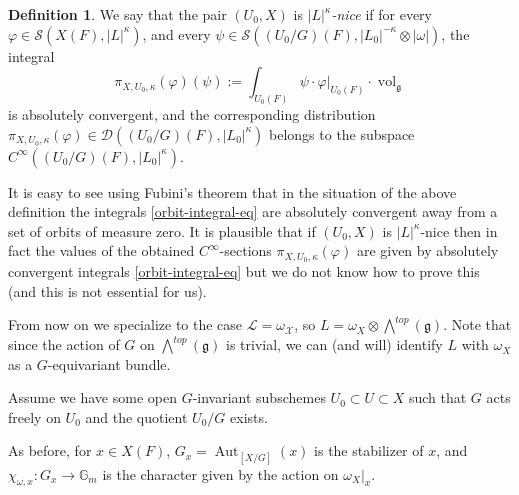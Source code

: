\documentclass[12pt,reqno]{amsart}
\DeclareMathOperator\C{\mathbb C}
\theoremstyle{definition}
\newtheorem{definition}[theorem]{Definition}
\theoremstyle{remark}
\numberwithin{equation}{section}
\newcommand{\Aut}{\operatorname{Aut}}
\newcommand{\ot}{\otimes}
\newcommand{\DD}{{\mathcal D}}
\renewcommand{\SS}{{\mathcal S}}
\newcommand{\LL}{{\mathcal L}}
\newcommand{\sub}{\subset}
\newcommand{\om}{\omega}
\newcommand{\G}{{\mathbb G}}
\newcommand{\XX}{{\mathcal X}}
\newcommand{\fg}{{\mathfrak g}}
\newcommand{\vol}{{\operatorname{vol}}}
\begin{document}
\begin{definition}
We say that the pair $(U_0,X)$ is {\it $|L|^{\kappa}$-nice} if for every $\varphi\in \SS(X(F),|L|^{\kappa})$, and every 
$\psi\in \SS((U_0/G)(F),|L_0|^{-\kappa}\ot |\om|)$, the integral 
\begin{equation}\label{distr-integral-eq}
\pi_{X,U_0,\kappa}(\varphi)(\psi):=\int_{U_0(F)} \psi\cdot \varphi|_{U_0(F)}\cdot \vol_{\fg}
\end{equation} 
is absolutely convergent, and the corresponding distribution
$\pi_{X,U_0,\kappa}(\varphi)\in \DD((U_0/G)(F),|L_0|^{\kappa})$ belongs to the subspace $C^\infty((U_0/G)(F),|L_0|^{\kappa})$.
\end{definition}

It is easy to see using Fubini's theorem that in the situation of the above definition the integrals \eqref{orbit-integral-eq} are absolutely convergent away from
a set of orbits of measure zero. It is plausible that if $(U_0,X)$ is $|L|^{\kappa}$-nice then in fact the values of the obtained $C^\infty$-sections $\pi_{X,U_0,\kappa}(\varphi)$ are given
by absolutely convergent integrals \eqref{orbit-integral-eq} but we do not know how to prove this (and this is not essential for us).

From now on we specialize to the case $\LL=\om_{\XX}$, so $L=\om_X\ot {\bigwedge}^{top}(\fg)$. Note that since the action of $G$ on ${\bigwedge}^{top}(\fg)$ is trivial,
we can (and will) identify $L$ with $\om_X$ as a $G$-equivariant bundle.

Assume we have some  open $G$-invariant subschemes $U_0\sub U\sub X$ such that $G$ acts freely on $U_0$ and the quotient $U_0/G$ exists. 


As before, for $x\in X(F)$, $G_x=\Aut_{[X/G]}(x)$ is the stabilizer of $x$, and $\chi_{\om,x}:G_x\to\G_m$ is the character given by the action on $\om_X|_x$.
\end{document}
